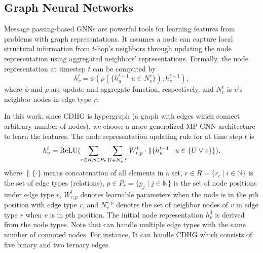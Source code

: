 \subsection{Graph Neural Networks}

Message passing-based GNNs are powerful tools for learning features from problems with graph representations. It assumes a node can capture local structural information from $t$-hop's neighbors through updating the node representation using aggregated neighbors' representations. Formally, the node representation at timestep $t$ can be computed by
\begin{equation}\label{message-passing-based-GNN}
  h_{v}^{t} = \phi(\rho(\{h_{u}^{t-1}|u \in N_{v}^{r}\}), h_{v}^{t-1}),
\end{equation}
where $\phi$ and $\rho$ are update and aggregate function, respectively, and
$N_{v}^{r}$ is $v$'s neighbor nodes in edge type $r$.

 In this work, since CDHG is hypergraph (a graph with edges which connect arbitrary number of nodes), we choose a more generalized MP-GNN architecture \hyperedgeGNN to learn the features.
The node representation updating rule for \hyperedgeGNN at time step $t$ is
\begin{equation}\label{Hyperedge-GNN-definition}
  h_{v}^{t} = {\rm ReLU}(\sum_{r\in R,p\in P_{r}}\sum_{U\in N_{v}^{r,p}} W_{r,p}^{t}\cdot \| \{ h_{u}^{t-1}\mid u\in \{U \vee v\} \} ),
\end{equation}
where $\| \{\cdot \}$ means concatenation of all elements in a set,
$r\in R = \{r_i\mid i\in \mathbb{N} \}$ is the set of edge types (relations),
$p\in P_{r}=\{p_{j} \mid j\in \mathbb{N} \}$ is the set of node positions under edge type $r$,
$W_{r,p}^{t}$ denotes learnable parameters when the node is in the $p$th position with edge type $r$, and 
$N_{v}^{r,p}$ denotes the set of neighbor nodes of $v$ in edge type $r$ when $v$ is in $p$th position.
The initial node representation $h_{v}^{0}$ is derived from the node types. Note that \hyperedgeGNN can handle multiple edge types with the same number of connoted nodes. For instance, It can handle CDHG which consists of five binary and two ternary edges.




% 



